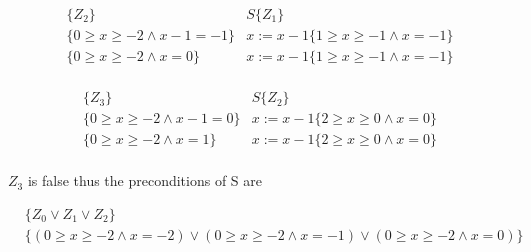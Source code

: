 \documentclass[10pt,a4paper]{article}
\begin{document}
\begin{equation}
\begin{split}
 \{Z_2\}&S\{Z_1\}\\
  \{  0 \geq x \geq -2\wedge x-1=-1\}&x:=x-1\{ 1 \geq x \geq -1\wedge x=-1\}\\
    \{  0 \geq x \geq -2\wedge x=0\}&x:=x-1\{ 1 \geq x \geq -1\wedge x=-1\}\\
\end{split}
  \end{equation} 

  
\begin{equation}
\begin{split}
 \{Z_3\}&S\{Z_2\}\\
  \{  0 \geq x \geq -2\wedge x-1=0\}&x:=x-1 \{ 2 \geq x \geq 0\wedge x=0\}\\
    \{ 0 \geq x \geq -2\wedge x=1\}&x:=x-1 \{ 2 \geq x \geq 0\wedge x=0\}\\
\end{split}
  \end{equation} 


$Z_3$ is false thus the preconditions of S are

\begin{equation}
\begin{split}
 &\{Z_0 \vee Z_1 \vee Z_2\}\\
 &\{(0 \geq x \geq -2\wedge x=-2)\vee (0 \geq x \geq -2\wedge x=-1)\vee( 0 \geq x \geq -2\wedge x=0)\}
 \end{split}
\end{equation}
\end{document}

